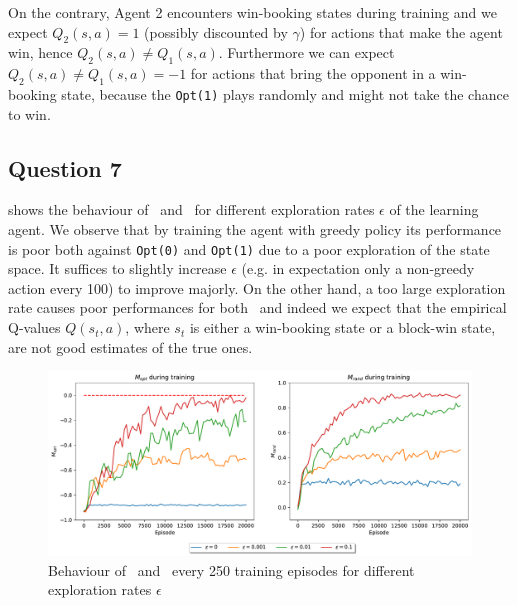 \documentclass[10pt]{IEEEtran}
\begin{document}
On the contrary, Agent 2 encounters win-booking states during training and we expect $Q_2(s,a) = 1$ (possibly discounted by $\gamma$) for actions that make the agent win, hence $Q_2(s,a) \neq Q_1(s,a)$. Furthermore we can expect $Q_2(s,a) \neq Q_1(s,a) = -1$ for actions that bring the opponent in a win-booking state, because the \texttt{Opt(1)} plays randomly and might not take the chance to win.

\subsection*{Question 7}
 shows the behaviour of \mopt\ and \mrand\ for different exploration rates $\epsilon$ of the learning agent. We observe that by training the agent with greedy policy its performance is poor both against \texttt{Opt(0)} and \texttt{Opt(1)} due to a poor exploration of the state space. It suffices to slightly increase $\epsilon$ (e.g. in expectation only a non-greedy action every 100) to improve majorly. On the other hand, a too large exploration rate causes poor performances for both \mopt\ and \mrand\: indeed we expect that the empirical Q-values $Q(s_t, a)$, where $s_t$ is either a win-booking state or a block-win state, are not good estimates of the true ones.
\begin{figure}[H]
    \centering
    \includegraphics[width=\linewidth]{code/figures/performance_epsilon_self.pdf}
    \caption{Behaviour of \mopt\ and \mrand\ every 250 training episodes for different exploration rates $\epsilon$}
    \label{plot_question7}
\end{figure}
\end{document}
